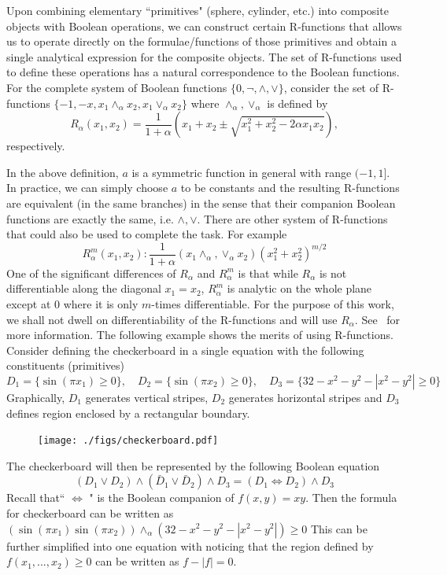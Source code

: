 \documentclass[11pt,reqno]{amsart}
\theoremstyle{definition}
\begin{document}
Upon combining elementary ``primitives" (sphere, cylinder, etc.) into composite objects with Boolean operations, we can construct certain R-functions that allows us to operate directly on the formulae/functions of those primitives and obtain a single analytical expression for the composite objects. The set of R-functions used to define these operations has a natural correspondence to the Boolean functions. For the complete system of Boolean functions $\{0, \neg, \wedge, \vee\}$, consider the set of R-functions $\{-1,-x, x_1\wedge_\alpha x_2, x_1\vee_\alpha x_2\}$ where $\wedge_\alpha, \vee_\alpha$ is defined by
\[
R_\alpha(x_1,x_2)=\frac{1}{1+\alpha} \left(x_1+x_2\pm \sqrt{x_1^2+x_2^2-2\alpha x_1x_2}\right),
\]
respectively.

In the above definition, $a$ is a symmetric function in general with range $(-1,1]$. In practice, we can simply choose $a$ to be constants and the resulting R-functions are equivalent (in the same branches) in the sense that their companion Boolean functions are exactly the same, i.e. $\wedge,\vee$. There are other system of R-functions that could also be used to complete the task. For example
$$R_{\alpha}^m(x_1,x_2): \frac{1}{1+\alpha} (x_1 \wedge_\alpha ,\vee_\alpha x_2)(x_1^2+x_2^2)^{m/2}$$
One of the significant differences of $R_\alpha$ and $R_{\alpha}^{m}$ is that while $R_\alpha$ is not differentiable along the diagonal $x_1=x_2$, $R_{\alpha}^m$ is analytic on the whole plane except at $0$ where it is only $m$-times differentiable. For the purpose of this 
work, we shall not dwell on differentiability of the R-functions and will use $R_\alpha$. See~\cite{Shapiro} for more information.
The following example shows the merits of using R-functions. Consider defining the checkerboard in a single equation with the following constituents (primitives) 
$$D_1=\{\sin(\pi x_1)\geq 0\}, \quad D_2=\{\sin(\pi x_2)\geq 0\},\quad D_3=\{32-x^2-y^2-|x^2-y^2|\geq 0\}$$ 
Graphically, $D_1$ generates vertical stripes, $D_2$ generates horizontal stripes and $D_3$ defines region enclosed by a rectangular boundary. 
\begin{figure}[H]
\texttt{[image: ./figs/checkerboard.pdf]}
\end{figure}

The checkerboard will then be represented by the following Boolean equation
$$(D_1\vee D_2)\wedge (\bar{D}_1\vee \bar{D}_2)\wedge D_3=(D_1\Leftrightarrow D_2)\wedge D_3$$
Recall that`` $\Leftrightarrow$ " is the Boolean companion of $f(x,y)=xy$. Then the formula for checkerboard can be written as 
$(\sin(\pi x_1)\sin(\pi x_2)) \wedge_\alpha (32-x^2-y^2-|x^2-y^2|) \geq 0$
This can be further simplified into one equation with noticing that the region defined by $f(x_1,...,x_2)\geq 0$ can be written as $f-|f|= 0$.  
\end{document}
